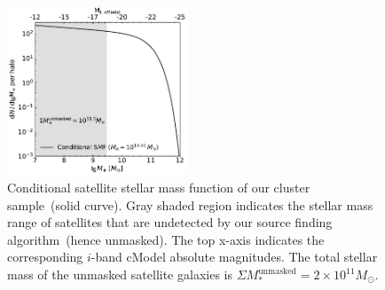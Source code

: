 \documentclass[fleqn,usenatbib]{mnras}
\newcommand{\msol}{M_{\odot}}
\begin{document}
\begin{figure}
    \includegraphics[width=0.48\textwidth]{fig/sat_icl_mass_estimation.pdf}
    \caption{Conditional satellite stellar mass function of our cluster
    sample~(solid curve). Gray shaded region indicates the stellar mass
    range of satellites that are undetected by our source finding
    algorithm~(hence unmasked). The top x-axis indicates the corresponding
    $i$-band cModel absolute magnitudes. The total stellar mass of the
    unmasked satellite galaxies is $\Sigma M_*^{\mathrm{unmasked}}=2\times
    10^{11}\msol$. \label{fig:csmf} }
\end{figure}
\end{document}
